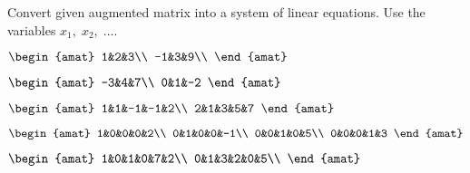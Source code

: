 

\begin{Exercise}[
name={},
title={}, 
difficulty=0,
origin={\cite{GH}}]
Convert given augmented matrix into a system of linear equations. Use the variables $x_1,\;x_2,\;\ldots$.
\begin{multicols}{2}
\Question
$
\begin{amat}{2}
1&2&3\\
-1&3&9\\
\end{amat}
$

\Question
$
\begin{amat}{2}
-3&4&7\\
0&1&-2
\end{amat}
$

\Question
$
\begin{amat}{4}
1&1&-1&-1&2\\
2&1&3&5&7
\end{amat}
$

\Question
$
\begin{amat}{4}
1&0&0&0&2\\
0&1&0&0&-1\\
0&0&1&0&5\\
0&0&0&1&3
\end{amat}
$

\Question
$
\begin{amat}{5}
1&0&1&0&7&2\\
0&1&3&2&0&5\\
\end{amat}
$
\EndCurrentQuestion
\end{multicols}
\end{Exercise}

